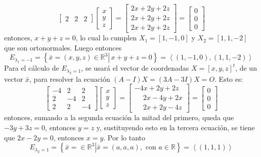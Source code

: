 \begin{solucion}
\begin{enumerate}
\begin{equation*}
\begin{bmatrix}
    2 & 2 & 2
   \end{bmatrix}
   \begin{bmatrix}
    x \\ y \\ z
   \end{bmatrix}
   =
   \begin{bmatrix}
    2x + 2y + 2z \\
    2x + 2y + 2z \\
    2x + 2y + 2z
   \end{bmatrix}
   =
   \begin{bmatrix}
    0 \\ 0 \\ 0
   \end{bmatrix}
  \end{equation*}
  entonces, $x+y+z = 0$, lo cual lo cumplen $X_1=[1,-1,0]$ y $X_2 = [1,1,-2]$ que son ortonormales. Luego entonces
  \begin{equation*}
   E_{\lambda_1 = -1} = 
   \left\{ \left. \bar{x} = (x,y,z) \in \mathbb{R}^3 \right| \, x + y + z = 0 \right\} = \left< (1,-1, 0), (1, 1, -2) \right>
  \end{equation*}
  Para el c\'alculo de $E_{\lambda_2 = 1}$, se usar\'a el vector de coordenadas $X = [x,y,z]^t$, de un vector $\bar{x}$, para resolver la ecuaci\'on $(A - I)X = (3A-3I)X = O$. Esto es:
  \begin{equation*}
   \begin{bmatrix}
    -4 &  2 &  2 \\
     2 & -4 &  2 \\
     2 &  2 & -4
   \end{bmatrix}
   \begin{bmatrix}
    x \\ y \\ z
   \end{bmatrix}
   = 
   \begin{bmatrix}
    -4x + 2y + 2z \\ 
    \phantom{-}2x - 4y + 2x \\ \phantom{-}2x + 2y - 4z
   \end{bmatrix}
   =
   \begin{bmatrix}
    0 \\ 0 \\ 0
   \end{bmatrix}
  \end{equation*}
  entonces, sumando a la segunda ecuaci\'on la mitad del primero, queda que $-3y+3z = 0$, entonces $y=z$ y, sustituyendo esto en la tercera ecuaci\'on, se tiene que $2x-2y = 0$, entonces $x=y$. Por lo tanto
  \begin{equation*}
   E_{\lambda_2 = 1} = \left\{ \left. \bar{x}=\in \mathbb{R}^3 \right| \bar{x} = (a,a,a), \text{ con } a\in\mathbb{R} \right\} = \left< (1,1,1) \right>
  \end{equation*}
  

\end{enumerate}
\end{solucion}
